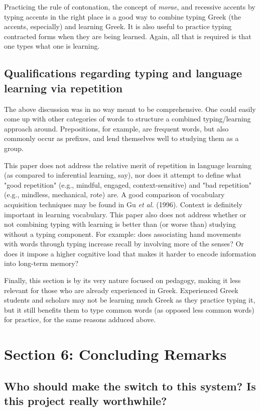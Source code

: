\documentclass[11pt]{article}
\begin{document}
Practicing the rule of contonation, the concept of \emph{morae}, and recessive accents by typing accents in the right place is a good way to combine typing Greek (the accents, especially) and learning Greek. It is also useful to practice typing contracted forms when they are being learned. Again, all that is required is that one types what one is learning.

\subsection{Qualifications regarding typing and language learning via repetition}
\label{sec:orgf121b60}

The above discussion was in no way meant to be comprehensive. One could easily come up with other categories of words to structure a combined typing/learning approach around. Prepositions, for example, are frequent words, but also commonly occur as prefixes, and lend themselves well to studying them as a group.

This paper does not address the relative merit of repetition in language learning (as compared to inferential learning, say), nor does it attempt to define what "good repetition" (e.g., mindful, engaged, context-sensitive) and "bad repetition" (e.g., mindless, mechanical, rote) are. A good comparison of vocabulary acquisition techniques may be found in Gu \emph{et al.} (1996). Context is definitely important in learning vocabulary. This paper also does not address whether or not combining typing with learning is better than (or worse than) studying without a typing component. For example: does associating hand movements with words through typing increase recall by involving more of the senses? Or does it impose a higher cognitive load that makes it harder to encode information into long-term memory?

Finally, this section is by its very nature focused on pedagogy, making it less relevant for those who are already experienced in Greek. Experienced Greek students and scholars may not be learning much Greek as they practice typing it, but it still benefits them to type common words (as opposed less common words) for practice, for the same reasons adduced above.

\section{Section 6: Concluding Remarks}
\label{sec:orgd015e61}

\subsection{Who should make the switch to this system? Is this project really worthwhile?}
\label{sec:org1e1524e}
\end{document}
